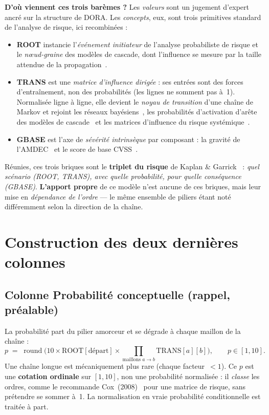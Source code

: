 \documentclass[11pt,a4paper]{article}
\newcommand{\fl}{\ensuremath{\!\rightarrow\!}}
\begin{document}
\begin{cle}
\textbf{D'où viennent ces trois barèmes ?} Les \emph{valeurs} sont un jugement d'expert ancré
sur la structure de DORA. Les \emph{concepts}, eux, sont trois primitives standard de
l'analyse de risque, ici recombinées :
\begin{itemize}[leftmargin=1.4em,itemsep=1pt,topsep=2pt]
\item \textbf{ROOT} instancie l'\emph{événement initiateur} de l'analyse probabiliste de
  risque et le \emph{n\oe{}ud-graine} des modèles de cascade, dont l'influence se mesure par la
  taille attendue de la propagation~\cite{KaplanGarrick1981,Kempe2003}.
\item \textbf{TRANS} est une \emph{matrice d'influence dirigée} : ses entrées sont des forces
  d'entraînement, non des probabilités (les lignes ne somment pas à~1). Normalisée ligne à
  ligne, elle devient le \emph{noyau de transition} d'une chaîne de Markov et rejoint les
  réseaux bayésiens~\cite{Pearl1988}, les probabilités d'activation d'arête des modèles de
  cascade~\cite{Kempe2003} et les matrices d'influence du risque systémique~\cite{Battiston2012}.
\item \textbf{GBASE} est l'axe de \emph{sévérité intrinsèque} par composant : la gravité de
  l'AMDEC~\cite{IEC60812} et le score de base CVSS~\cite{CVSS}.
\end{itemize}
Réunies, ces trois briques sont le \textbf{triplet du risque} de Kaplan \& Garrick~\cite{KaplanGarrick1981} :
\emph{quel scénario (ROOT, TRANS), avec quelle probabilité, pour quelle conséquence (GBASE)}.
\textbf{L'apport propre} de ce modèle n'est aucune de ces briques, mais leur mise en
\emph{dépendance de l'ordre} --- le même ensemble de piliers étant noté différemment selon la
direction de la chaîne.
\end{cle}

\section{Construction des deux dernières colonnes}

\subsection*{Colonne \og{}Probabilité conceptuelle\fg{} (rappel, préalable)}

La probabilité part du pilier amorceur et se dégrade à chaque maillon de la chaîne :
\begin{equation}
p \;=\; \operatorname{round}\!\Big(10 \times \text{ROOT}[\text{départ}]
      \times \!\!\prod_{\text{maillons } a\fl b}\!\! \text{TRANS}[a][b]\Big),
\qquad p \in [1,10].
\end{equation}
Une chaîne longue est mécaniquement plus rare (chaque facteur~$<1$). Ce $p$ est une
\textbf{cotation ordinale} sur $[1,10]$, non une probabilité normalisée : il \emph{classe} les
ordres, comme le recommande Cox~(2008)~\cite{Cox2008} pour une matrice de risque, sans prétendre
se sommer à~1. La normalisation en vraie probabilité conditionnelle est traitée à part.
\end{document}
